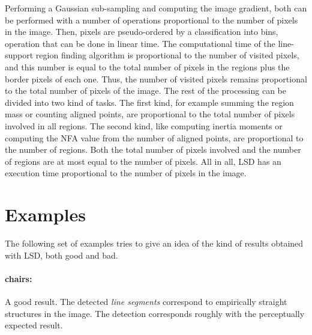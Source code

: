 \documentclass{ipol}
\begin{document}
Performing a Gaussian sub-sampling and computing the image gradient,
both can be performed with a number of operations proportional to the
number of pixels in the image. Then, pixels are pseudo-ordered by a
classification into bins, operation that can be done in linear
time. The computational time of the line-support region finding
algorithm is proportional to the number of visited pixels, and this
number is equal to the total number of pixels in the regions plus the
border pixels of each one. Thus, the number of visited pixels remains
proportional to the total number of pixels of the image. The rest of
the processing can be divided into two kind of tasks. The first kind,
for example summing the region mass or counting aligned points, are
proportional to the total number of pixels involved in all
regions. The second kind, like computing inertia moments or computing
the NFA value from the number of aligned points, are proportional to
the number of regions. Both the total number of pixels involved and
the number of regions are at most equal to the number of pixels. All
in all, LSD has an execution time proportional to the number of pixels
in the image.

\section{Examples}

The following set of examples tries to give an idea of the kind of
results obtained with LSD, both good and bad.

\paragraph{chairs:} A good result. The detected \emph{line segments}
correspond to empirically straight structures in the image. The
detection corresponds roughly with the perceptually expected result.
\end{document}
